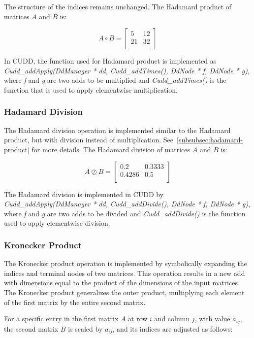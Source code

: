 The structure of the indices remains unchanged.
The Hadamard product of matrices $A$ and $B$ is:

\[
    A \circ B = \begin{bmatrix}
                    5  & 12 \\
                    21 & 32 \\
    \end{bmatrix}
\]

In CUDD, the function used for Hadamard product is implemented as \textit{Cudd\_addApply(DdManager * dd, Cudd\_addTimes(), DdNode * f, DdNode * g)}, where \textit{f} and \textit{g} are two \glspl{add} to be multiplied and \textit{Cudd\_addTimes()} is the function that is used to apply elementwise multiplication.

\subsubsection{Hadamard Division}
The Hadamard division operation is implemented similar to the Hadamard product, but with division instead of multiplication.
See~\autoref{subsubsec:hadamard-product} for more details.
The Hadamard division of matrices $A$ and $B$ is:

\[
    A \oslash B = \begin{bmatrix}
                      0.2    & 0.3333 \\
                      0.4286 & 0.5    \\
    \end{bmatrix}
\]

The Hadamard division is implemented in CUDD by \textit{Cudd\_addApply(DdManager * dd, Cudd\_addDivide(), DdNode * f, DdNode * g)}, where \textit{f} and \textit{g} are two \glspl{add} to be divided and \textit{Cudd\_addDivide()} is the function used to apply elementwise division.

\subsubsection{Kronecker Product}\label{subsubsec:kronecker-product}
The Kronecker product operation is implemented by symbolically expanding the indices and terminal nodes of two matrices.
This operation results in a new \gls{add} with dimensions equal to the product of the dimensions of the input matrices.
The Kronecker product generalizes the outer product, multiplying each element of the first matrix by the entire second matrix.

For a specific entry in the first matrix $A$ at row $i$ and column $j$, with value $a_{ij}$, the second matrix $B$ is scaled by $a_{ij}$, and its indices are adjusted as follows:

